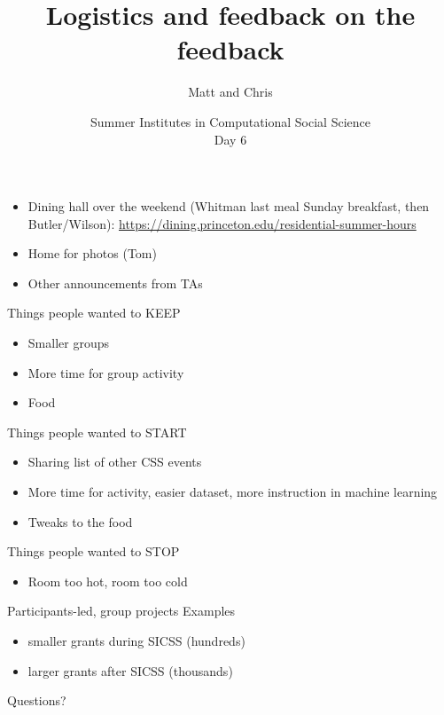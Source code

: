\documentclass{beamer}
\title[]{Logistics and feedback on the feedback}
\author[]{Matt and Chris}
\date[]{Summer Institutes in Computational Social Science\\Day 6
}
\begin{document}
\frame{\titlepage}
\begin{frame}

\begin{itemize}
\item Dining hall over the weekend (Whitman last meal Sunday breakfast, then Butler/Wilson):  \url{https://dining.princeton.edu/residential-summer-hours}
\pause
\item Home for photos (Tom)
\pause
\item Other announcements from TAs
\end{itemize}

\end{frame}
\begin{frame}

Things people wanted to KEEP
\begin{itemize}
\item Smaller groups 
\item More time for group activity
\item Food
\end{itemize}

\end{frame}
\begin{frame}

Things people wanted to START
\begin{itemize}
\item Sharing list of other CSS events
\pause
\item More time for activity, easier dataset, more instruction in machine learning
\pause
\item Tweaks to the food
\end{itemize}

\end{frame}
\begin{frame}

Things people wanted to STOP
\begin{itemize}
\item Room too hot, room too cold
\end{itemize}

\end{frame}
\begin{frame}

Participants-led, group projects
\pause
Examples
\pause
\begin{itemize}
\item smaller grants during SICSS (hundreds)
\item larger grants after SICSS (thousands)
\end{itemize}

\end{frame}
\begin{frame}

\begin{center}
\LARGE
Questions?
\end{center}

\end{frame}
\end{document}
